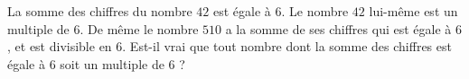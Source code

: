 
\begin{exercice}\label{exosmath-0861}

    La somme des chiffres du nombre \( 42\) est égale à \( 6\). Le nombre \( 42\) lui-même est un multiple de \( 6\). De même le nombre \( 510\) a la somme de ses chiffres qui est égale à \( 6\), et est divisible en \( 6\). Est-il vrai que tout nombre dont la somme des chiffres est égale à \( 6\) soit un multiple de \( 6\) ?

\end{exercice}
